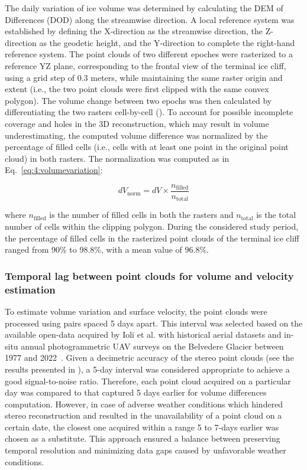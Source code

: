 The daily variation of ice volume was determined by calculating the DEM of Differences
(DOD) along the streamwise direction. A local reference system was established by
defining the X-direction as the streamwise direction, the Z-direction as the geodetic
height, and the Y-direction to complete the right-hand reference system.
The point clouds of two different epoches were rasterized to a reference YZ plane,
corresponding to the frontal view of the terminal ice cliff, using a grid step of 0.3
meters, while maintaining the same raster origin and extent (i.e., the two point clouds
were first clipped with the same convex polygon).
The volume change between two epochs was then calculated by differentiating the
two rasters cell-by-cell ().
To account for possible incomplete coverage and holes in the 3D reconstruction, which may
result in volume underestimating, the computed volume difference was normalized by the
percentage of filled cells (i.e., cells with at least one point in the original point
cloud) in both rasters.
The normalization was computed as in Eq.~\ref{eq:4:volumevariation}:

\begin{equation}
  dV_{\text{norm}} = dV \times
  \frac{n_{\text{filled}}}{n_{\text{total}}}
  \label{eq:4:volumevariation}
\end{equation}

where \( n_{\text{filled}} \) is the number of filled cells in both the rasters and \(
n_{\text{total}} \) is the total number of cells within the clipping polygon.
During the considered study period, the percentage of filled cells in the rasterized
point clouds of the terminal ice cliff ranged from 90\% to
98.8\%, with a mean value of 96.8\%.


\subsubsection{Temporal lag between point clouds for volume and velocity estimation}
\label{sec:4:timelag}

To estimate volume variation and surface velocity, the point clouds were processed using
pairs spaced 5 days apart.
This interval was selected based on the available open-data acquired by Ioli et al. with
historical aerial datasets and in-situ annual photogrammetric UAV surveys on the
Belvedere Glacier between 1977 and 2022~\citep{Ioli2022,ioli_2023_zenodo,Degaetani2021}.
Given a decimetric accuracy of the stereo point clouds (see the results presented
in ), a 5-day interval was considered appropriate to
achieve a good signal-to-noise ratio.
Therefore, each point cloud acquired on a particular day was compared to that captured
5 days earlier for volume differences computation.
However, in case of adverse weather conditions which hindered stereo reconstruction and
resulted in the unavailability of a point cloud on a certain date, the closest one
acquired within a range 5 to 7-days earlier was chosen as a substitute.
This approach ensured a balance between preserving temporal resolution and minimizing
data gaps caused by unfavorable weather conditions.

